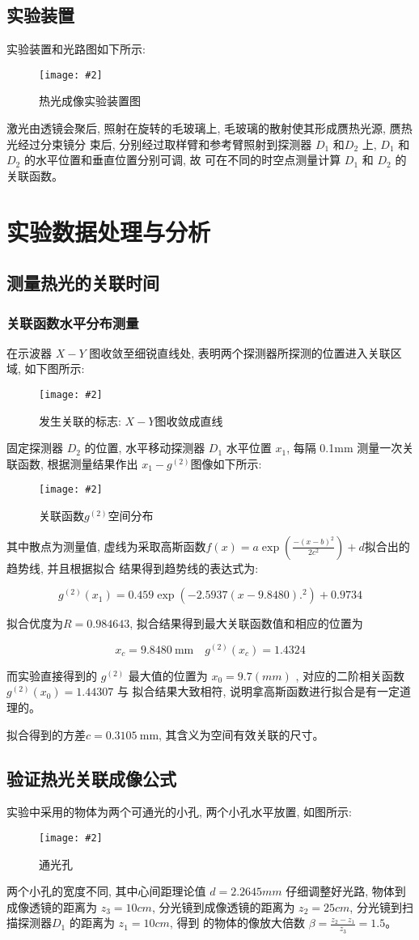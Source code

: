 \documentclass[12pt,a4paper]{article}
\newcommand{\be}[1]{
    \begin{equation}
        #1
    \end{equation}
}
\newcommand{\bfig}[3]{
    \begin{figure}[H]
        \centering
        \texttt{[image: \#2]}
        \caption{#3}
    \end{figure}
}
\begin{document}
\subsection{实验装置}
实验装置和光路图如下所示:
\bfig{0.8}{热光成像实验装置图.png}{热光成像实验装置图}
激光由透镜会聚后, 照射在旋转的毛玻璃上, 毛玻璃的散射使其形成赝热光源, 赝热光经过分束镜分
束后, 分别经过取样臂和参考臂照射到探测器 $D_1$ 和$ D_2$ 上, $D_1$ 和 $D_2$ 的水平位置和垂直位置分别可调, 故
可在不同的时空点测量计算 $D_1$ 和 $D_2$ 的关联函数。
\section{实验数据处理与分析}
\subsection{测量热光的关联时间}
\subsubsection{关联函数水平分布测量}
在示波器 $X − Y$ 图收敛至细锐直线处, 表明两个探测器所探测的位置进入关联区域, 如下图所示: 
\bfig{0.6}{x-y图.jpg}{发生关联的标志: $X-Y$图收敛成直线}
固定探测器 $D_2$ 的位置, 水平移动探测器 $D_1$ 水平位置 $x_1$, 每隔
0.1mm 测量一次关联函数, 根据测量结果作出 $x_1 − g^{(2)}$图像如下所示:
\bfig{0.8}{空间关联.png}{关联函数$g^{(2)}$空间分布}
其中散点为测量值, 虚线为采取高斯函数$f(x)=a \exp \left(\frac{-\left(x-b\right)^{2}}{2 c^{2}}\right)+d$拟合出的趋势线, 并且根据拟合
结果得到趋势线的表达式为:
\be{g^{(2)}(x_1)= 0.459 \exp{(-2.5937(x-9.8480).^2)}+0.9734}
拟合优度为$R=0.984643$, 拟合结果得到最大关联函数值和相应的位置为
\be{x_{c}=9.8480\mathrm{~mm} \quad g^{(2)}\left(x_{c}\right)=1.4324}
而实验直接得到的 $g^{(2)}$ 最大值的位置为 $x_0 = 9.7(mm)$ , 对应的二阶相关函数 $g^{(2)}(x_0) = 1.44307$ 与
拟合结果大致相符, 说明拿高斯函数进行拟合是有一定道理的。

拟合得到的方差$c=0.3105 \mathrm{~mm}$, 其含义为空间有效关联的尺寸。
\subsection{验证热光关联成像公式}
实验中采用的物体为两个可通光的小孔, 两个小孔水平放置, 如图所示:
\bfig{0.8}{通光孔.jpg}{通光孔}
两个小孔的宽度不同, 其中心间距理论值 $d = 2.2645mm$ 仔细调整好光路, 物体到成像透镜的距离为
$z_3 = 10cm$, 分光镜到成像透镜的距离为 $z_2 = 25cm$, 分光镜到扫描探测器$ D_1$ 的距离为 $z_1 = 10cm$, 得到
的物体的像放大倍数 $\beta =\frac{z_2 − z_1}{z_3}= 1.5$。
\end{document}
